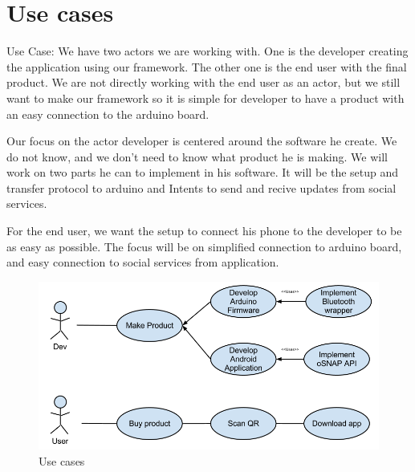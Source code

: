 \newpage
\section{Use cases}
Use Case:
We have two actors we are working with. One is the developer creating the application using our framework. The other one is the end user with the final product. We are not directly working with the end user as an actor, but we still want to make our framework so it is simple for developer to have a product with an easy connection to the arduino board.

Our focus on the actor developer is centered around the software he create. We do not know, and we don't need to know what product he is making. We will work on two parts he can to implement in his software. It will be the setup and transfer protocol to arduino and Intents to send and recive updates from social services.

For the end user, we want the setup to connect his phone to the developer to be as easy as possible. The focus will be on simplified connection to arduino board, and easy connection to social services from application.
\begin{figure}[hb!]
\centering \includegraphics[scale=0.50]{img/use-cases.png}
\caption{Use cases}
\label{fig:architecture}
\end{figure}

